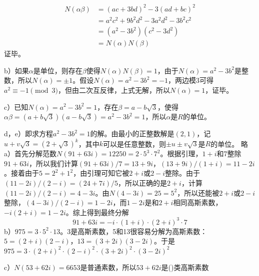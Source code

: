 \begin{align*}
N(\alpha\beta)&=(ac+3bd)^2-3(ad+bc)^2 \\
&=a^2c^2+9b^2d^2-3a^2d^2-3b^2c^2 \\
&=(a^2-3b^2)(c^2-3d^2) \\
&=N(\alpha)N(\beta)
\end{align*}
证毕。\par
b）\proof 如果$\alpha$是单位，则存在$\beta$使得$N(\alpha)N(\beta)=1$，由于$N(\alpha)=a^2-3b^2$是整数，所以$N(\alpha)=\pm1$。假设$N(\alpha)=a^2-3b^2=-1$，两边模3可得$a^2\equiv-1\pmod3$，但由二次互反律，上式无解，所以$N(\alpha)=1$，证毕。\par
c）已知$N(\alpha)=a^2-3b^2=1$，存在$\beta=a-b\sqrt3$，使得$\alpha\beta=(a+b\sqrt3)(a-b\sqrt3)=a^2-3b^2=1$，所以$\alpha$是$R$的单位。\par
d，e）即求方程$a^2-3b^2=1$的解。由最小的正整数解是$(2,1)$，记$u+v\sqrt3=(2+\sqrt3)^k$，其中$k$可以是任意整数，则$\pm u\pm v\sqrt3$是$R$的单位。
%
\exercise 略
%
\exercise a）首先分解范数$N(91+63i)=12250=2\cdot5^3\cdot7^2$。根据引理，$1+i$和7整除$91+63i$，所以我们计算$(91+63i)/7=13+9i$，$(13+9i)/(1+i)=11-2i$。接着由于$5=2^2+1^2$，由引理可知它被$2+i$或$2-i$整除。由于$(11-2i)/(2-i)=(24+7i)/5$，所以正确的是$2+i$，计算$(11-2i)/(2-i)=4-3i$。由$N(4-3i)=25=5^2$，所以还能被$2+i$或$2-i$整除，$(4-3i)/(2-i)=1-2i$，而$1-2i$是和$2+i$相同高斯素数，$-i(2+i)=1-2i$。综上得到最终分解
\[91+63i=-i\cdot(1+i)\cdot(2+i)^3\cdot7\]
b）$975=3\cdot5^2\cdot13$。3是高斯素数，5和13很容易分解为高斯素数：$5=(2+i)(2-i)$，$13=(3+2i)(3-2i)$。于是$975=3\cdot(2+i)^2\cdot(2-i)^2\cdot(3+2i)^2\cdot(3-2i)^2$\par
c）$N(53+62i)=6653$是普通素数，所以$53+62i$是()类高斯素数

